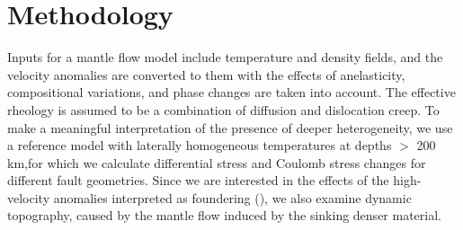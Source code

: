 \documentclass[draft,linenumbers]{agujournal2018}
\begin{document}
\section{Methodology}
    Inputs for a mantle flow model include temperature and density fields, and the velocity anomalies are converted to them with the effects of anelasticity, compositional variations, and phase changes are taken into account. The effective rheology is assumed to be a combination of diffusion and dislocation creep. To make a meaningful interpretation of the presence of deeper heterogeneity, we use a reference model with laterally homogeneous temperatures at depths $>$ 200 km,for which we calculate differential stress and Coulomb stress changes for different fault geometries. Since we are interested in the effects of the high-velocity anomalies interpreted as foundering (\citep{Biryol_2016}), we also examine dynamic topography, caused by the mantle flow induced by the sinking denser material. 
    
\end{document}
